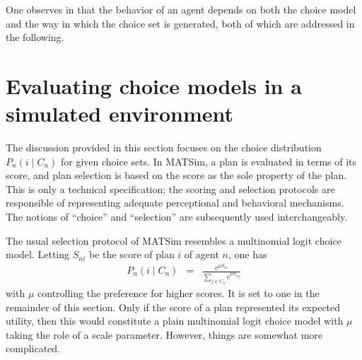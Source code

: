 One observes in  that the
behavior of an agent depends on both the choice model and the way
in which the choice set is generated, both of which are addressed
in the following.

\section{\label{sec:Evaluating-choice-models}Evaluating choice models in
a simulated environment}

The discussion provided in this section focuses on the choice distribution
$P_{n}(i\mid C_{n})$ for given choice sets. In MATSim, a plan is
evaluated in terms of its score, and plan selection is based on the
score as the sole property of the plan. This is only a technical specification;
the scoring and selection protocols are responsible of representing
adequate perceptional and behavioral mechanisms. The notions of {}``choice''
and {}``selection'' are subsequently used interchangeably. 

The usual selection protocol of MATSim resembles a multinomial logit
choice model. Letting $S_{ni}$ be the score of plan $i$ of agent
$n$, one has
\begin{eqnarray}
P_{n}(i\mid C_{n}) & = & \frac{e^{\mu S_{ni}}}{\sum_{j\in C_{n}}e^{\mu S_{nj}}}\label{eq:ExpBetaPlanSelector}
\end{eqnarray}
with $\mu$ controlling the preference for higher scores.
It is set to one in the remainder of this section. Only if the score
of a plan represented its expected utility, then this would constitute
a plain multinomial logit choice model with $\mu$ taking the role
of a scale parameter. However, things are somewhat more complicated.

